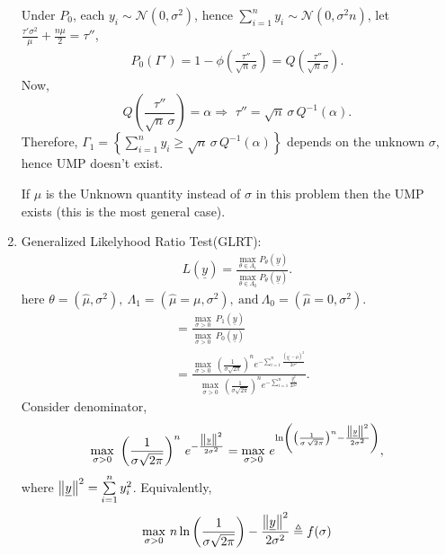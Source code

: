 \documentclass[a4paper,english,12pt]{article}
\begin{document}
\begin{enumerate}[label=(\alph*).]
Under $P_0$, each $y_i \sim \mathcal{N}(0,\sigma^2)$, hence $\sum\limits_{i=1}^ny_i \sim \mathcal{N}(0,\sigma^2 n)$, let $\frac{\tau \prime \sigma^2}{\mu}+\frac{n\mu}{2}=\tau''$,
\begin{align*}
P_0(\Gamma')=1-\phi\left(\frac{\tau''}{\sqrt{n}\, \sigma}\right)=Q\left(\frac{\tau''}{\sqrt{n}\, \sigma}\right).
\end{align*}
Now,
\begin{equation*}
Q\left(\frac{\tau''}{\sqrt{n}\, \sigma}\right)=\alpha\Rightarrow \,\, \tau''=\sqrt{n}\,\sigma \, Q^{-1}(\alpha).
\end{equation*}
Therefore, $\Gamma_1=\left \{ \sum\limits_{i=1}^n y_i\geq \sqrt{n}\,\sigma \, Q^{-1}(\alpha) \right \}$ depends on the unknown $\sigma$, hence UMP doesn't exist.
\begin{note}
If $\mu$ is the Unknown quantity instead of $\sigma$ in this problem then the UMP exists (this is the most general case).
\end{note}
\item Generalized Likelyhood Ratio Test(GLRT):
\begin{align*}
L(\underline{y})=\frac{\underset{\theta \in \Lambda_1}{\max} P_\theta \left( \underline{y} \right)}{\underset{\theta \in \Lambda_0}{\max} P_\theta \left( \underline{y} \right)}.
\end{align*}
here $\theta = (\hat{\mu},\sigma^2),~\Lambda_1 =(\hat{\mu}=\mu,\sigma^2),~\mbox{and}~\Lambda_0 = (\hat{\mu}=0,\sigma^2)$.\\
\begin{align*}
&=\frac{\underset{\sigma >0}{\max}~P_1(\underline{y})}{\underset{\sigma >0}{\max}~P_0(\underline{y})}\\
&=\frac{\underset{\sigma >0}{\max}~\left(\frac{1}{\sigma \sqrt{2\pi}}\right)^n e^{- \sum \limits_{i=1}^n \frac{(y_i-\mu)^2}{2\sigma^2}}}{\underset{\sigma >0}{\max}~\left(\frac{1}{\sigma \sqrt{2\pi}}\right)^n e^{- \sum \limits_{i=1}^n\frac{y_i^2}{2\sigma^2}}}.
\end{align*}
Consider denominator,
\begin{equation*}
\underset{\sigma >0}{\max}~\left(\frac{1}{\sigma \sqrt{2\pi}}\right)^n \, e^{-\frac{ \left\lVert\underline{y}\right\rVert^2}{2 \sigma^2}}=\underset{\sigma >0}{\max}~e^{\ln\left(\left(\frac{1}{\sigma\, \sqrt{2 \pi}}\right)^n - \frac{\left\lVert\underline{y}\right\rVert^2}{2\sigma^2}\right)},
\end{equation*}
where $\left\lVert\underline{y}\right\rVert^2=\sum \limits_{i=1}^n y_i^2$. Equivalently,
\begin{equation*}
\underset{\sigma >0}{\max}~n\ln\left(\frac{1}{\sigma \sqrt{2 \pi}}\right)-\frac{\norm{\underline{y}}^2}{2\sigma^2}\triangleq f(\sigma)

\end{equation*}
\end{enumerate}
\end{document}

